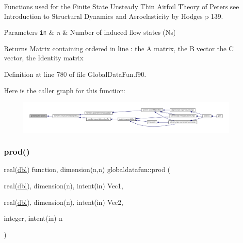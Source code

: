 Functions used for the Finite State Unsteady Thin Airfoil Theory of Peters see Introduction to Structural Dynamics and Aeroelasticity by Hodges p 139. 


\begin{DoxyParams}[1]{Parameters}
\mbox{\tt in}  & {\em n} & Number of induced flow states (Ns)\\
\hline
\end{DoxyParams}
\begin{DoxyReturn}{Returns}
Matrix containing ordered in line \+: the A matrix, the B vector the C vector, the Identity matrix 
\end{DoxyReturn}


Definition at line 780 of file Global\+Data\+Fun.\+f90.

Here is the caller graph for this function\+:\nopagebreak
\begin{figure}[H]
\begin{center}
\leavevmode
\includegraphics[width=350pt]{namespaceglobaldatafun_a9bdeebcd65cb298adc440430560beddc_icgraph}
\end{center}
\end{figure}
\mbox{\label{namespaceglobaldatafun_afe68f9e5d61e5e7844a0a4b225bb3825}} 
\subsubsection{\texorpdfstring{prod()}{prod()}}
{\footnotesize\ttfamily real(\hyperlink{namespaceglobaldatafun_a5008801201dd34f2af8eae07756befb4}{dbl}) function, dimension(n,n) globaldatafun\+::prod (\begin{DoxyParamCaption}\item[{real(\hyperlink{namespaceglobaldatafun_a5008801201dd34f2af8eae07756befb4}{dbl}), dimension(n), intent(in)}]{Vec1,  }\item[{real(\hyperlink{namespaceglobaldatafun_a5008801201dd34f2af8eae07756befb4}{dbl}), dimension(n), intent(in)}]{Vec2,  }\item[{integer, intent(in)}]{n }\end{DoxyParamCaption})\hspace{0.3cm}{\ttfamily [private]}}



